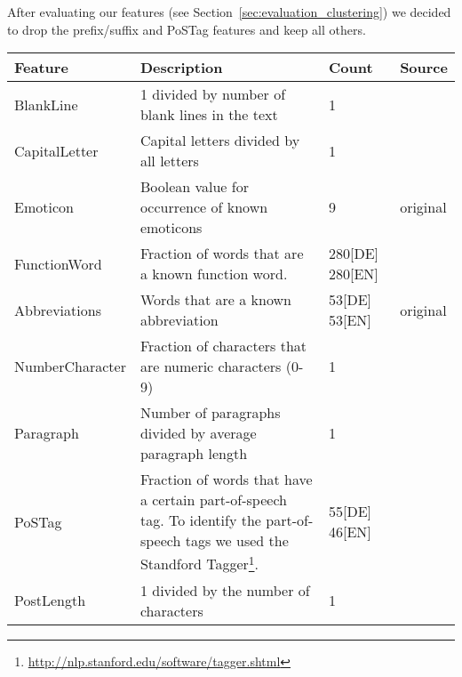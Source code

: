 After evaluating our features (see Section~\ref{sec:evaluation_clustering}) we decided to drop the prefix/suffix and PoSTag features and keep all others.



\begin{table}[h]
    \begin{center}
    \begin{tabular}{p{2.6cm}|p{6cm}|p{1.2cm}|p{1.2cm}}
    Feature                 & Description                                                               & Count             & Source\\ \hline \hline
    BlankLine               & 1 divided by number of blank lines in the text                            & 1                 & \cite{de2001mining}\\ \hline
    CapitalLetter           & Capital letters divided by all letters                                    & 1                 & \cite{argamon2003style} \cite{de2001mining}\\ \hline
    Emoticon                & Boolean value for occurrence of known emoticons                           & 9                 & original\\ \hline
    FunctionWord            & Fraction of words that are a known function word.                         & 280[DE] 280[EN]   & \cite{argamon2003style} \cite{de2001mining} \cite{madigan2005author} \cite{narayanan2012feasibility}\\ \hline
    Abbreviations           & Words that are a known abbreviation                                       & 53[DE] 53[EN]     & original\\ \hline
    NumberCharacter         & Fraction of characters that are numeric characters (0-9)                  & 1                 & \cite{narayanan2012feasibility}\\ \hline
    Paragraph               & Number of paragraphs divided by average paragraph length                  & 1                 & \cite{argamon2003style}\\ \hline
    PoSTag                  & Fraction of words that have a certain part-of-speech tag. To identify the part-of-speech tags we used the Standford Tagger\footnote{\url{http://nlp.stanford.edu/software/tagger.shtml}}.
                                                                                                        & 55[DE] 46[EN]     & \cite{madigan2005author}\\ \hline
    PostLength              & 1 divided by the number of characters                                     & 1                 & \cite{narayanan2012feasibility}\\ \hline

\end{tabular}
\end{center}
\end{table}
